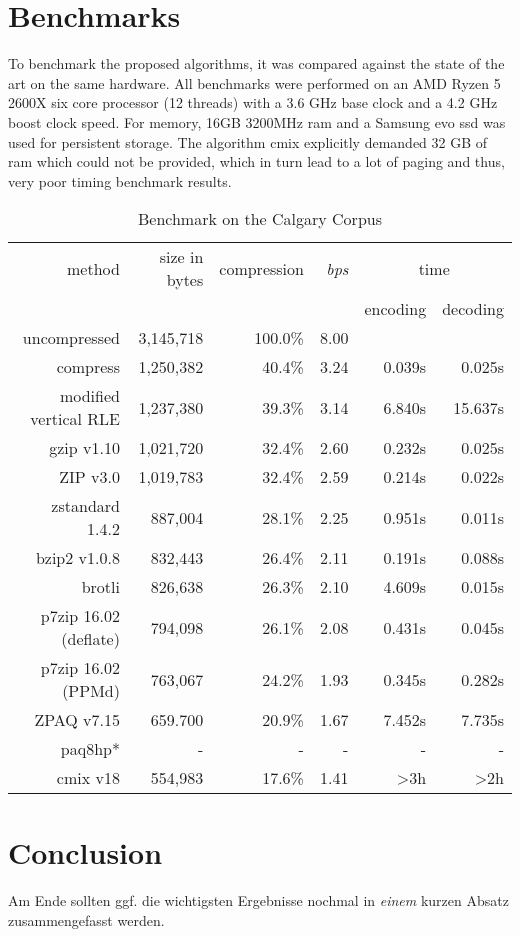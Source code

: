 \section{Benchmarks}
\label{ch:Evaluation:sec:Benchmarks}
\par{
	To benchmark the proposed algorithms, it was compared against the state of the art on the same hardware. All benchmarks were performed on an AMD Ryzen 5 2600X six core processor (12 threads) with a 3.6 GHz base clock and a 4.2 GHz boost clock speed. For memory, 16GB 3200MHz ram and a Samsung evo ssd was used for persistent storage. The algorithm cmix explicitly demanded 32 GB of ram which could not be provided, which in turn lead to a lot of paging and thus, very poor timing benchmark results.
}
	\begin{table}[h]
	\begin{tabular}{r|r|r|r|r|r}
		method  &  size in bytes & compression & \textit{bps} & \multicolumn{2}{c}{time }\\
		& & & & encoding & decoding\\
		\hline
		uncompressed & 3,145,718 & 100.0\% & 8.00 & &\\
		compress & 1,250,382 & 40.4\% & 3.24 & 0.039s & 0.025s\\
		modified vertical RLE & 1,237,380 & 39.3\%& 3.14 & 6.840s & 15.637s\\
		gzip v1.10 & 1,021,720 & 32.4\% & 2.60 & 0.232s & 0.025s\\
		ZIP v3.0 & 1,019,783 & 32.4\% & 2.59 & 0.214s & 0.022s\\
		zstandard 1.4.2& 887,004 & 28.1\% & 2.25 & 0.951s & 0.011s\\
		bzip2 v1.0.8 & 832,443 & 26.4\% & 2.11 & 0.191s & 0.088s\\
		brotli & 826,638 & 26.3\%& 2.10 & 4.609s & 0.015s\\
		p7zip 16.02 (deflate) &  794,098 & 26.1\% & 2.08 & 0.431s & 0.045s \\
		p7zip 16.02 (PPMd) &  763,067& 24.2\% & 1.93 & 0.345s & 0.282s\\
		ZPAQ v7.15 & 659.700 & 20.9\% & 1.67 & 7.452s & 7.735s\\
		paq8hp* & - & - & - & - & -\\ 
		cmix v18 & 554,983 & 17.6\% & 1.41 & >3h & >2h		
	\end{tabular}
	\label{tab:t100benchmark}
	\caption{Benchmark on the Calgary Corpus}
\end{table}

\par{

}

\section{Conclusion}
\label{ch:Evaluation:sec:Conclusion}

Am Ende sollten ggf. die wichtigsten Ergebnisse nochmal in \emph{einem} kurzen Absatz zusammengefasst werden.

